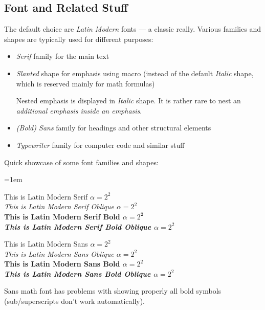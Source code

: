 \subsection{Font and Related Stuff}%
\label{sub:Font}

The default choice are \emph{Latin Modern} fonts --- a classic really.
Various families and shapes are typically used for different purposes:
\begin{itemize}
    \item \emph{Serif} family for the main text
    \item \emph{Slanted} shape for emphasis using \macro{\emph} macro (instead of the default \emph{Italic} shape, which is reserved mainly for math formulas)
          \begin{remark}
              Nested emphasis is displayed in \emph{Italic} shape.
              It is rather rare to nest an \emph{additional \emph{emphasis} inside an emphasis}.
          \end{remark}
    \item \emph{(Bold) Sans} family for headings and other structural elements
    \item \emph{Typewriter} family for computer code and similar stuff
\end{itemize}
\vspace{1ex}

\begin{example}
    Quick showcase of some font families and shapes:\par \leftskip=1em

    {                  This is Latin Modern Serif \(\alpha = 2^{2}\)}\\
    {\slshape          This is Latin Modern Serif Oblique \(\alpha = 2^{2}\)}\\
    {\bfseries         This is Latin Modern Serif Bold \(\alpha = 2^{\bm{{2}}}\)}\\
    {\bfseries\slshape This is Latin Modern Serif Bold Oblique \(\alpha = 2^{2}\)}

    {\sffamily                  This is Latin Modern Sans \(\alpha = 2^{2}\)}\\
    {\sffamily\slshape          This is Latin Modern Sans Oblique \(\alpha = 2^{2}\)}\\
    {\sffamily\bfseries         This is Latin Modern Sans Bold \(\alpha = 2^{2}\)}\\
    {\sffamily\bfseries\slshape This is Latin Modern Sans Bold Oblique \(\alpha = 2^{2}\)}
\end{example}
\begin{Note}
    Sans math font has problems with showing properly all bold symbols (sub/superscripts don't work automatically).
\end{Note}

